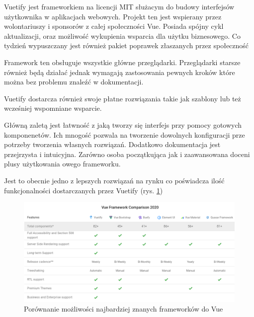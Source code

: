 Vuetify jest frameworkiem na licencji MIT  służacym do budowy interfejsów użytkownika w aplikacjach webowych. Projekt ten jest wspierany przez wolontariuszy i sponsorów z całej społeczności Vue. Posiada spójny cykl aktualizacji, oraz możliwość wykupienia wsparcia dla użytku biznesowego. Co tydzień wypuszczany jest również pakiet poprawek złaszanych przez społeczność

Framework ten obsługuje wszystkie główne przeglądarki. Przeglądarki starsze również będą działać jednak wymagają zastosowania pewnych kroków które można bez problemu znaleźć w dokumentacji.

Vuetify dostarcza również swoje płatne rozwiązania takie jak szablony lub też wcześniej wspomniane wsparcie.

Główną zaletą jest łatwność z jaką tworzy się interfejs przy pomocy gotowych komponenetów. Ich mnogość pozwala na tworzenie dowolnych konfiguracji prze potrzeby tworzenia własnych rozwiązań. Dodatkowo dokumentacja jest przejrzysta i intuicyjna. Zarówno osoba początkująca jak i zaawansowana doceni plusy użytkowania owego frameworku.

Jest to obecnie jedno z lepszych rozwiązań na rynku co poświadcza ilość funkcjonalności dostarczanych przez Vuetify (rys. \ref{fig:vuetifyjs})

\begin{figure}[H]
    \centering
    \includegraphics[width=6in]{images/vuetifyjs.png}
    \caption{Porównanie możliwości najbardziej znanych frameworków do Vue \label{fig:vuetifyjs}}
\end{figure}